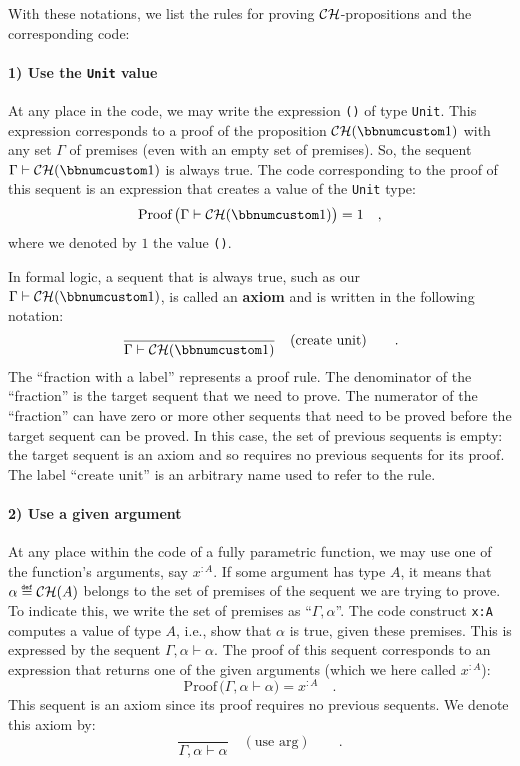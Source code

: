 With these notations, we list the rules for proving ${\cal CH}$-propositions
and the corresponding code:

\paragraph{1) Use the \texttt{Unit} value}

At any place in the code, we may write the expression \lstinline!()!
of type \lstinline!Unit!. This expression corresponds to a proof
of the proposition ${\cal CH}(\bbnum 1)$ with any set $\Gamma$ of
premises (even with an empty set of premises). So, the sequent $\Gamma\vdash{\cal CH}(\bbnum 1)$
is always true. The code corresponding to the proof of this sequent
is an expression that creates a value of the \lstinline!Unit! type:
\[
\text{Proof}\,\big(\Gamma\vdash{\cal CH}(\bbnum 1)\big)=1\quad,
\]
where we denoted by $1$ the value \lstinline!()!.

In formal logic, a sequent that is always true, such as our $\Gamma\vdash{\cal CH}(\bbnum 1)$,
is called an \textbf{axiom} and is written in
the following notation:
\[
\frac{}{\Gamma\vdash{\cal CH}(\bbnum 1)}\quad(\text{create unit})\quad\quad.
\]
The \textsf{``}fraction with a label\textsf{''} represents a proof rule. The denominator
of the \textsf{``}fraction\textsf{''} is the target sequent that we need to prove.
The numerator of the \textsf{``}fraction\textsf{''} can have zero or more other sequents
that need to be proved before the target sequent can be proved. In
this case, the set of previous sequents is empty: the target sequent
is an axiom and so requires no previous sequents for its proof. The
label \textsf{``}$\text{create unit}$\textsf{''} is an arbitrary name used to refer
to the rule.

\paragraph{2) Use a given argument}

At any place within the code of a fully parametric function, we may
use one of the function\textsf{'}s arguments, say $x^{:A}$. If some argument
has type $A$, it means that $\alpha\triangleq{\cal CH}(A)$ belongs
to the set of premises of the sequent we are trying to prove. To indicate
this, we write the set of premises as \textsf{``}$\Gamma,\alpha$\textsf{''}. The
code construct \lstinline!x:A! computes a value of type $A$, i.e.,
show that $\alpha$ is true, given these premises. This is expressed
by the sequent $\Gamma,\alpha\vdash\alpha$. The proof of this sequent
corresponds to an expression that returns one of the given arguments
(which we here called $x^{:A}$):
\[
\text{Proof}\,\big(\Gamma,\alpha\vdash\alpha\big)=x^{:A}\quad.
\]
This sequent is an axiom since its proof requires no previous sequents.
We denote this axiom by:
\[
\frac{~}{\Gamma,\alpha\vdash\alpha}\quad(\text{use arg})\quad\quad.
\]


